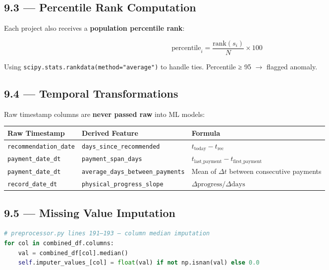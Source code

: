 \documentclass[11pt,a4paper]{article}
\begin{document}
\subsection{9.3 --- Percentile Rank Computation}

Each project also receives a \textbf{population percentile rank}:

\[ \text{percentile}_i = \frac{\text{rank}(s_i)}{N} \times 100 \]

Using \texttt{scipy.stats.rankdata(method="average")} to handle ties. Percentile ≥ 95 $\rightarrow$ flagged anomaly.

\subsection{9.4 --- Temporal Transformations}

Raw timestamp columns are \textbf{never passed raw} into ML models:

\begin{table}[htbp]
\centering
\small
\begin{tabularx}{\textwidth}{l l Y}
\toprule
\textbf{Raw Timestamp} & \textbf{Derived Feature} & \textbf{Formula} \\
\midrule
\texttt{recommendation\_date} & \texttt{days\_since\_recommended} & $t_\text{today} - t_\text{rec}$ \\
\texttt{payment\_date\_dt} & \texttt{payment\_span\_days} & $t_\text{last\_payment} - t_\text{first\_payment}$ \\
\texttt{payment\_date\_dt} & \texttt{average\_days\_between\_payments} & Mean of $\Delta t$ between consecutive payments \\
\texttt{record\_date\_dt} & \texttt{physical\_progress\_slope} & $\Delta\text{progress} / \Delta\text{days}$ \\
\bottomrule
\end{tabularx}
\end{table}


\subsection{9.5 --- Missing Value Imputation}

\begin{lstlisting}[language=Python]
# preprocessor.py lines 191–193 — column median imputation
for col in combined_df.columns:
    val = combined_df[col].median()
    self.imputer_values_[col] = float(val) if not np.isnan(val) else 0.0
\end{lstlisting}
\end{document}

